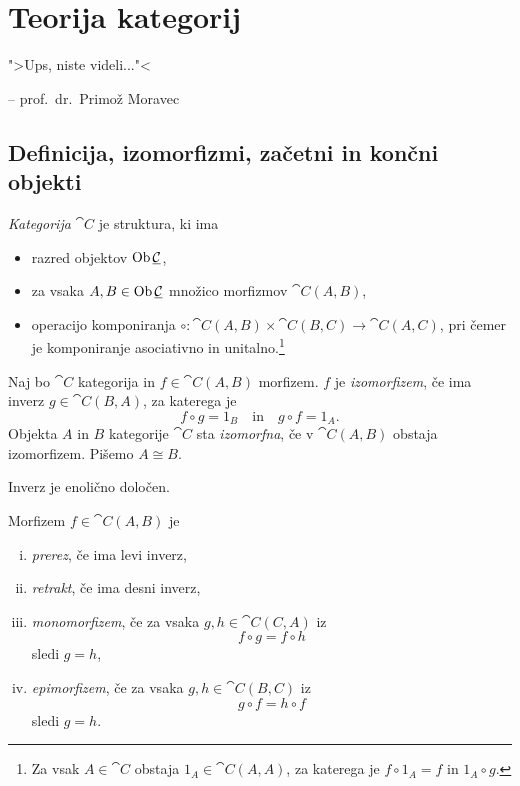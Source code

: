\section{Teorija kategorij}

\epigraph{">Ups, niste videli..."<}{-- prof.~dr.~Primož Moravec}

\subsection{Definicija, izomorfizmi, začetni in končni objekti}


\begin{definicija}
\emph{Kategorija} $\cat{C}$ je struktura, ki ima

\begin{itemize}
\item razred objektov $\operatorname{Ob} \underline{\mathcal{C}}$,
\item za vsaka $A, B \in \operatorname{Ob} \underline{\mathcal{C}}$ množico morfizmov
$\cat{C}(A, B)$,
\item operacijo komponiranja
$\circ \colon \cat{C}(A,B) \times \cat{C}(B,C) \to \cat{C}(A,C)$,
pri čemer je komponiranje asociativno in unitalno.\footnote{Za vsak
$A \in \cat{C}$ obstaja $1_A \in \cat{C}(A,A)$, za katerega je
$f \circ 1_A = f$ in $1_A \circ g$.}
\end{itemize}
\end{definicija}

\begin{definicija}
Naj bo $\cat{C}$ kategorija in $f \in \cat{C}(A,B)$ morfizem. $f$
je \emph{izomorfizem}, če ima inverz
$g \in \cat{C}(B,A)$, za katerega je
\[
f \circ g = 1_B
\quad \text{in} \quad
g \circ f = 1_A.
\]
Objekta $A$ in $B$ kategorije $\cat{C}$ sta \emph{izomorfna}, če
v $\cat{C}(A,B)$ obstaja izomorfizem. Pišemo $A \cong B$.
\end{definicija}

\begin{opomba}
Inverz je enolično določen.
\end{opomba}

\begin{definicija}
Morfizem $f \in \cat{C}(A,B)$ je

\begin{enumerate}[i)]
\item \emph{prerez}, če ima levi inverz,
\item \emph{retrakt}, če ima desni inverz,
\item \emph{monomorfizem}, če za vsaka $g, h \in \cat{C}(C,A)$ iz
\[
f \circ g = f \circ h
\]
sledi $g = h$,
\item \emph{epimorfizem}, če za vsaka $g, h \in \cat{C}(B,C)$ iz
\[
g \circ f = h \circ f
\]
sledi $g = h$.
\end{enumerate}
\end{definicija}

